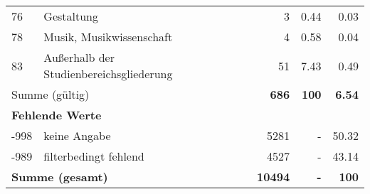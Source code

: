\begin{longtable}{lXrrr}
        76 & \multicolumn{1}{X}{Gestaltung} & %
          \num{3} &
          \num[round-mode=places,round-precision=2]{0.44} &
          \num[round-mode=places,round-precision=2]{0.03} \\

        78 & \multicolumn{1}{X}{Musik, Musikwissenschaft} & %
          \num{4} &
          \num[round-mode=places,round-precision=2]{0.58} &
          \num[round-mode=places,round-precision=2]{0.04} \\

        83 & \multicolumn{1}{X}{Außerhalb der Studienbereichsgliederung} & %
          \num{51} &
          \num[round-mode=places,round-precision=2]{7.43} &
          \num[round-mode=places,round-precision=2]{0.49} \\

     \midrule
     \multicolumn{2}{l}{Summe (gültig)} &
       \textbf{\num{686}} &
     \textbf{\num{100}} &
       \textbf{\num[round-mode=places,round-precision=2]{6.54}} \\
     \multicolumn{5}{l}{\textbf{Fehlende Werte}}\\
       -998 &
       keine Angabe &
         \num{5281} &
        - &
         \num[round-mode=places,round-precision=2]{50.32} \\
       -989 &
       filterbedingt fehlend &
         \num{4527} &
        - &
         \num[round-mode=places,round-precision=2]{43.14} \\
     \midrule
     \multicolumn{2}{l}{\textbf{Summe (gesamt)}} &
          \textbf{\num{10494}} &
        \textbf{-} &
        \textbf{\num{100}} \\
     \bottomrule
     \end{longtable}
     
